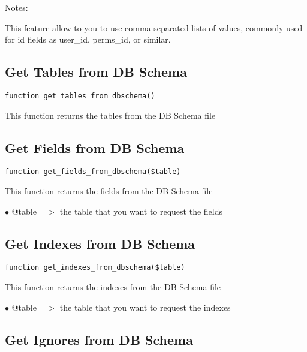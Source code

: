 \documentclass[a4paper]{book}
\begin{document}
Notes:

This feature allow to you to use comma separated lists of values, commonly used for id
fields as user\_id, perms\_id, or similar.

\hypertarget{toc85}{}
\subsection{Get Tables from DB Schema}

\begin{lstlisting}
function get_tables_from_dbschema()
\end{lstlisting}

This function returns the tables from the DB Schema file

\hypertarget{toc86}{}
\subsection{Get Fields from DB Schema}

\begin{lstlisting}
function get_fields_from_dbschema($table)
\end{lstlisting}

This function returns the fields from the DB Schema file

\begin{compactitem}
\item[\color{myblue}$\bullet$] @table =$>$ the table that you want to request the fields
\end{compactitem}

\hypertarget{toc87}{}
\subsection{Get Indexes from DB Schema}

\begin{lstlisting}
function get_indexes_from_dbschema($table)
\end{lstlisting}

This function returns the indexes from the DB Schema file

\begin{compactitem}
\item[\color{myblue}$\bullet$] @table =$>$ the table that you want to request the indexes
\end{compactitem}

\hypertarget{toc88}{}
\subsection{Get Ignores from DB Schema}
\end{document}
